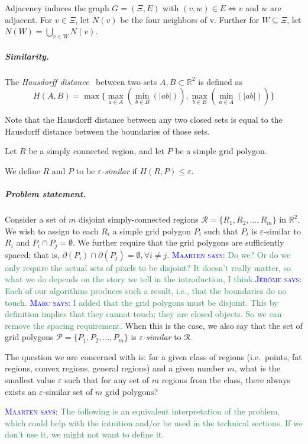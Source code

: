 \documentclass[a4paper,UKenglish,cleveref]{lipics-v2019}
\newcommand{\mremark}[3]{\textcolor{blue}{\textsc{#1 #2:}} \textcolor{SeaGreen}{\textsf{#3}}}
\newcommand{\maarten}[2][says]{\mremark{Maarten}{#1}{#2}}
\newcommand{\marc}[2][says]{\mremark{Marc}{#1}{#2}}
\newcommand{\jerome}[2][says]{\mremark{J\'er\^ome}{#1}{#2}}
\newcommand{\eps}{\varepsilon}
\newcommand{\R}{\mathbb{R}}
\begin{document}
Adjacency induces the graph $G=(\Xi, E)$ with $(v, w)\in E \iff v$ and $w$ are adjacent.
For $v\in \Xi$, let $N(v)$ be the four neighbors of v. Further for $W\subseteq \Xi$, let $N(W)=\bigcup_{v\in W} N(v)$.

\subparagraph {Similarity.}

The {\em Hausdorff distance}~\cite{} between two sets $A, B \subset \R^2$ is defined as
\[
  H(A, B) = \max \{\max_{a \in A}(\min_{b \in B}(|ab|)), \max_{b \in B}(\min_{a \in A}(|ab|))\}
\]

Note that the Hausdorff distance between any two closed sets is equal to the Hausdorff distance between the boundaries of those sets.

Let $R$ be a simply connected region, and let $P$ be a simple grid polygon.

\begin{definition}
We define $R$ and $P$ to be {\em $\eps$-similar} if $H(R,P) \le \eps$.
\end{definition}


\subparagraph {Problem statement.}

Consider a set of $m$ disjoint simply-connected regions $\mathcal{R} = \{R_1, R_2, \ldots, R_m\}$ in $\mathbb{R}^2$.
We wish to assign to each $R_i$ a simple grid polygon $P_i$ such that $P_i$ is $\eps$-similar to $R_i$ and $P_i\cap P_j=\emptyset$.
We further require that the grid polygons are sufficiently spaced; that is, $\partial(P_i) \cap \partial(P_j) = \emptyset, \forall i \ne j$. \maarten {Do we? Or do we only require the actual sets of pixels to be disjoint? It doesn't really matter, so what we do depends on the story we tell in the introduction, I think.}\jerome{Each of our algorithms produces such a result, i.e., that the boundaries do no touch.}
\marc{I added that the grid polygons must be disjoint. This by definition implies that they cannot touch; they are closed objects. So we can remove the spacing requirement.}
When this is the case, we also say that the set of grid polygons $\mathcal{P} = \{P_1, P_2, \ldots, P_m\}$ is {\em $\eps$-similar} to $\cal R$.

The question we are concerned with is: for a given class of regions (i.e.\ points, fat regions, convex regions, general regions) and a given number $m$, what is the smallest value $\eps$ such that for any set of $m$ regions from the class, there always exists an $\eps$-similar set of $m$ grid polygons?

\maarten {The following is an equivalent interpretation of the problem, which could help with the intuition and/or be used in the technical sections. If we don't use it, we might not want to define it.}
\end{document}

